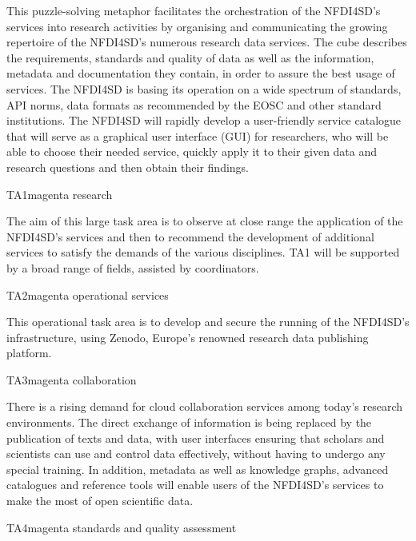 \documentclass[
  english,
  paper=a4,
  oneside,captions=tableheading
]{scrbook}
\begin{document}
This puzzle-solving metaphor facilitates the orchestration of the
NFDI4SD's services into research activities by organising and
communicating the growing repertoire of the NFDI4SD's numerous research
data services. The cube describes the requirements, standards and
quality of data as well as the information, metadata and documentation
they contain, in order to assure the best usage of services. The NFDI4SD
is basing its operation on a wide spectrum of standards, API norms, data
formats as recommended by the EOSC and other standard institutions. The
NFDI4SD will rapidly develop a user-friendly service catalogue that will
serve as a graphical user interface (GUI) for researchers, who will be
able to choose their needed service, quickly apply it to their given
data and research questions and then obtain their findings.

\begin{awesomeblock}[magenta]{1pt}{TA1}{magenta} research\end{awesomeblock}

The aim of this large task area is to observe at close range the
application of the NFDI4SD's services and then to recommend the
development of additional services to satisfy the demands of the various
disciplines. TA1 will be supported by a broad range of fields, assisted
by coordinators.

\begin{awesomeblock}[magenta]{1pt}{TA2}{magenta} operational services\end{awesomeblock}

This operational task area is to develop and secure the running of the
NFDI4SD's infrastructure, using Zenodo, Europe's renowned research data
publishing platform.

\begin{awesomeblock}[magenta]{1pt}{TA3}{magenta} collaboration\end{awesomeblock}

There is a rising demand for cloud collaboration services among today's
research environments. The direct exchange of information is being
replaced by the publication of texts and data, with user interfaces
ensuring that scholars and scientists can use and control data
effectively, without having to undergo any special training. In
addition, metadata as well as knowledge graphs, advanced catalogues and
reference tools will enable users of the NFDI4SD's services to make the
most of open scientific data.

\begin{awesomeblock}[magenta]{1pt}{TA4}{magenta} standards and quality assessment\end{awesomeblock}
\end{document}
